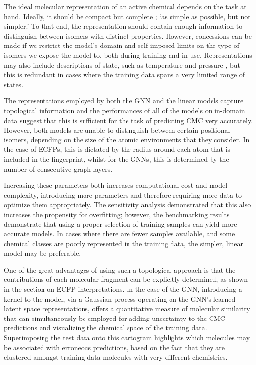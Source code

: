 The ideal molecular representation of an active chemical depends on the task at
hand. Ideally, it should be compact but complete
\cite{faberCrystalStructureRepresentations2015,himanenDScribeLibraryDescriptors2020};
`as simple as possible, but not simpler.' To that end, the representation should
contain enough information to distinguish between isomers with distinct
properties. However, concessions can be made if we restrict the model's domain
and self-imposed limits on the type of isomers we expose the model to, both
during training and in use. Representations may also include descriptions of
state, such as temperature and pressure \cite{chenGraphNetworksUniversal2019},
but this is redundant in cases where the training data spans a very limited
range of states.

The representations employed by both the GNN and the linear models capture
topological information and the performances of all of the models on in-domain
data suggest that this is sufficient for the task of predicting CMC very
accurately. However, both models are unable to distinguish between certain
positional isomers, depending on the size of the atomic environments that they
consider. In the case of ECFPs, this is dictated by the radius around each atom
that is included in the fingerprint, whilst for the GNNs, this is determined by
the number of consecutive graph layers.

Increasing these parameters both increases computational cost and model
complexity, introducing more parameters and therefore requiring more data to
optimize them appropriately. The sensitivity analysis demonstrated that this
also increases the propensity for overfitting; however, the benchmarking results
demonstrate that using a proper selection of training samples can yield more
accurate models. In cases where there are fewer samples available, and some
chemical classes are poorly represented in the training data, the simpler,
linear model may be preferable.

One of the great advantages of using such a topological approach is that the
contributions of each molecular fragment can be explicitly determined, as shown
in the section on ECFP interpretations. In the case of the GNN, introducing a
kernel to the model, via a Gaussian process operating on the GNN's learned
latent space representations, offers a quantitative measure of molecular
similarity that can simultaneously be employed for adding uncertainty to the CMC
predictions and visualizing the chemical space of the training data.
Superimposing the test data onto this cartogram highlights which molecules may
be associated with erroneous predictions, based on the fact that they are
clustered amongst training data molecules with very different chemistries.

